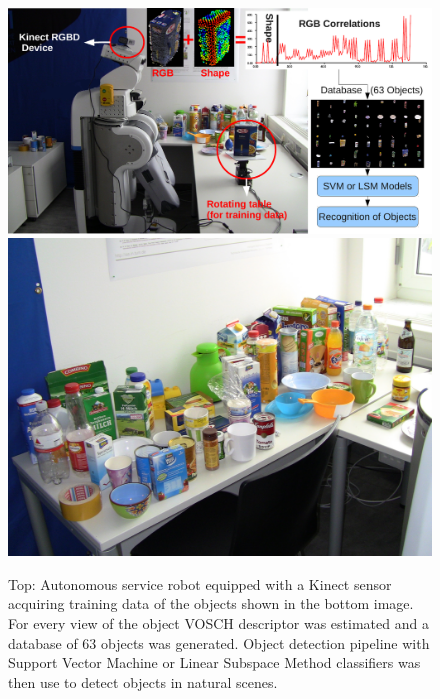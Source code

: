 \documentclass[conference]{sty/IEEEtran}
\begin{document}
\begin{figure}[htb!]
  \begin{center}
    \includegraphics[width=.99\columnwidth]{figures/firstpage/firstpage.pdf}
    \includegraphics[width=.99\columnwidth]{figures/objects/objects.jpg}
    \caption{Top: Autonomous service robot equipped with a Kinect sensor
    acquiring training data of the objects shown in the bottom image. For 
  every view of the object VOSCH descriptor was estimated and a database
of 63 objects was generated. Object detection pipeline with Support Vector
Machine or Linear Subspace Method classifiers was then use to detect objects
in natural scenes.}
    \label{fig:robot}
  \end{center}
\end{figure}

\end{document}
